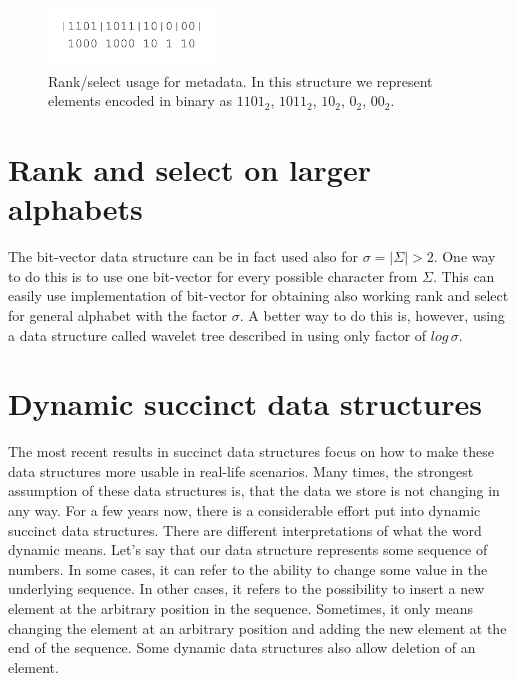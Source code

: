 \begin{figure}
\centerline{\includegraphics[width=0.4\textwidth]{images/obr_rank_select}}
\caption[Rank select usage in representation of sequence of elements with different size]{Rank/select usage for metadata. In this structure we represent elements encoded in binary as $1101_2$, $1011_2$, $10_2$, $0_2$, $00_2$.}
\label{obr:obr_rank_select}
\end{figure}

\section{Rank and select on larger alphabets}

The bit-vector data structure can be in fact used also for $\sigma = |\Sigma|>2$. One way to do this is to use one bit-vector for every possible character from $\Sigma$. This can easily use implementation of bit-vector for obtaining also working rank and select for general alphabet with the factor $\sigma$. A better way to do this is, however, using a data structure called wavelet tree described in \cite{grossi2003high} using only factor of $log\,\sigma$.

\section{Dynamic succinct data structures}

The most recent results in succinct data structures focus on how to make these data structures more usable in real-life scenarios. Many times, the
strongest assumption of these data structures is, that the data we store is not changing in any way. For a few years now, there is a considerable effort put into dynamic succinct data structures. There are different interpretations of what the word dynamic means. Let's say that our data structure represents some sequence of numbers. In some cases, it can refer to the ability to change some value in the underlying sequence. In other cases, it refers to the possibility to insert a new element at the arbitrary position in the sequence. Sometimes, it only means changing the element at an arbitrary position and adding the new element at the end of the sequence. Some dynamic data structures also allow deletion of an element.


